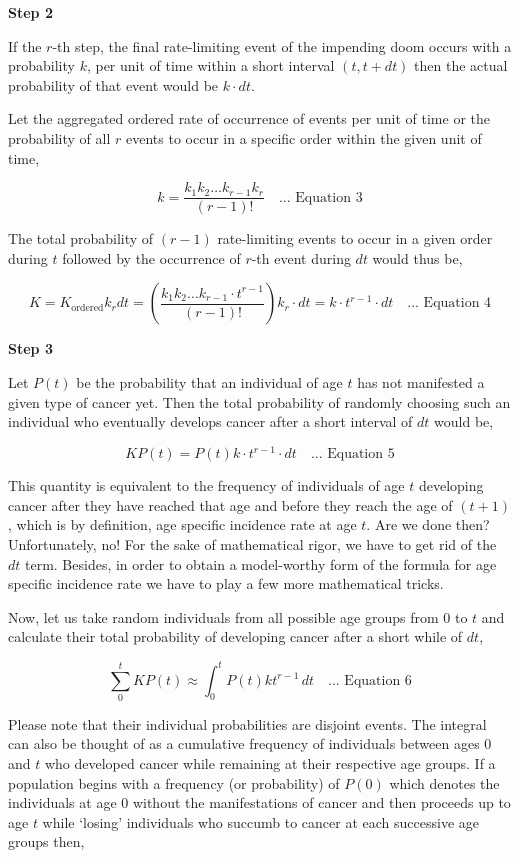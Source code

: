 \documentclass[lineno,sn-basic, Numbered]{sn-jnl}%
\theoremstyle{thmstyleone}%
\theoremstyle{thmstyletwo}%
\theoremstyle{thmstylethree}%
\begin{document}
\textbf{Step 2}

If the \( r \)-th step, the final rate-limiting event of the impending doom occurs with a probability \( k \), per unit of time within a short interval \( (t, t + dt) \) then the actual probability of that event would be \( k \cdot dt \).

Let the aggregated ordered rate of occurrence of events per unit of time or the probability of all \( r \) events to occur in a specific order within the given unit of time,

\[ k = \frac{k_1k_2\ldots k_{r-1}k_{r}}{(r - 1)!} \quad \text{... Equation 3} \]

The total probability of \( (r - 1) \) rate-limiting events to occur in a given order during \( t \) followed by the occurrence of \( r \)-th event during \( dt \) would thus be,

\[ K = K_{\text{ordered}} k_r dt = \left( \frac{k_1k_2\ldots k_{r-1}\cdot t^{r-1} }{(r - 1)!} \right) k_{r} \cdot dt = k \cdot t^{r-1} \cdot dt \quad \text{... Equation 4} \]

\textbf{Step 3}

Let \( P(t) \) be the probability that an individual of age \( t \) has not manifested a given type of cancer yet. Then the total probability of randomly choosing such an individual who eventually develops cancer after a short interval of \( dt \) would be,

\[ KP(t) = P(t) k \cdot t^{r-1} \cdot dt \quad \text{... Equation 5} \]

This quantity is equivalent to the frequency of individuals of age \( t \) developing cancer after they have reached that age and before they reach the age of \( (t + 1) \), which is by definition, age specific incidence rate at age \( t \). Are we done then? Unfortunately, no! For the sake of mathematical rigor, we have to get rid of the \( dt \) term. Besides, in order to obtain a model-worthy form of the formula for age specific incidence rate we have to play a few more mathematical tricks.

Now, let us take random individuals from all possible age groups from 0 to \( t \) and calculate their total probability of developing cancer after a short while of \( dt \),

\[
\sum_0^t KP(t) \approx \int_0^t P(t) k t^{r-1} \, dt \quad \text{... Equation 6}
\]

Please note that their individual probabilities are disjoint events. The integral can also be thought of as a cumulative frequency of individuals between ages 0 and \( t \) who developed cancer while remaining at their respective age groups. If a population begins with a frequency (or probability) of \( P(0) \) which denotes the individuals at age 0 without the manifestations of cancer and then proceeds up to age \( t \) while ‘losing’ individuals who succumb to cancer at each successive age groups then,
\end{document}

